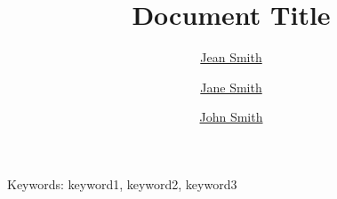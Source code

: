 \documentclass{article}
\title{Document Title}
\author[*]{\href{jean.s@mail.com}{Jean Smith}}
\author[*]{\href{jane.s@mail.com}{Jane Smith}}
\author[**]{\href{john.s@mail.com}{John Smith}}
\affil[*]{University of Gondor, Middle-earth}
\affil[**]{University of Mordor, Middle-earth}
\providecommand{\keywords}[1]{{Keywords:} #1}
\begin{document}
	\maketitle
	
	\keywords{keyword1, keyword2, keyword3}
\end{document}
